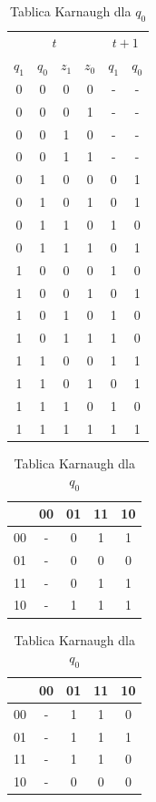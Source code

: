 \documentclass[12pt,a4paper]{article}
\begin{document}
			\begin{table}[H]
			\begin{minipage}{.5\textwidth}
				\caption{Tabela Prawdy - funkcja przejść}
				\vspace{0.2cm}
				\centering
				\begin{tabular}{cccc|cc}
					\multicolumn{4}{c|}{\(t\)}	&	\multicolumn{2}{c}{\(t+1\)} \\
					\(q_1\)&\(q_0\)&\(z_1\)&\(z_0\)&\(q_1\)&\(q_0\)\\\hline
					0	&	0	&	0	&	0	&	-	&	-	\\
					0	&	0	&	0	&	1	&	-	&	-	\\
					0	&	0	&	1	&	0	&	-	&	-	\\
					0	&	0	&	1	&	1	&	-	&	-	\\\hline
					0	&	1	&	0	&	0	&	0	&	1	\\
					0	&	1	&	0	&	1	&	0	&	1	\\
					0	&	1	&	1	&	0	&	1	&	0	\\
					0	&	1	&	1	&	1	&	0	&	1	\\\hline
					1	&	0	&	0	&	0	&	1	&	0	\\
					1	&	0	&	0	&	1	&	0	&	1	\\
					1	&	0	&	1	&	0	&	1	&	0	\\
					1	&	0	&	1	&	1	&	1	&	0	\\\hline
					1	&	1	&	0	&	0	&	1	&	1	\\
					1	&	1	&	0	&	1	&	0	&	1	\\
					1	&	1	&	1	&	0	&	1	&	0	\\
					1	&	1	&	1	&	1	&	1	&	1	\\
				\end{tabular}
			\end{minipage}%
			\begin{minipage}{.5\textwidth}
				\caption{Tablica Karnaugh dla $q_1$}
				\vspace{0.2cm}
				\centering
				\begin{tabular}{c|c|c|c|c}
					\backslashbox{$z_1z_0$}{$q_1q_0$}&00&01&11&10\\\hline
					00	&	-	&	0	&	1	&	1	\\\hline
					01	&	-	&	0	&	0	&	0	\\\hline
					11	&	-	&	0	&	1	&	1	\\\hline
					10	&	-	&	1	&	1	&	1	
				\end{tabular}
				\vspace{1cm}
				
				\caption{Tablica Karnaugh dla $q_0$}
				\vspace{0.2cm}
				\centering
				\begin{tabular}{c|c|c|c|c}
					\backslashbox{$z_1z_0$}{$q_1q_0$}&00&01&11&10\\\hline
					00	&	-	&	1	&	1	&	0	\\\hline
					01	&	-	&	1	&	1	&	1	\\\hline
					11	&	-	&	1	&	1	&	0	\\\hline
					10	&	-	&	0	&	0	&	0	
				\end{tabular}
			\end{minipage}
			\end{table}
		
\end{document}
